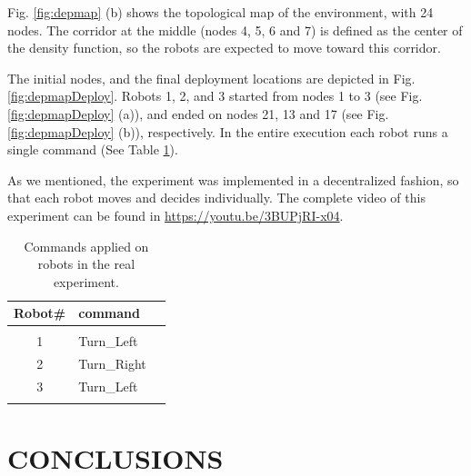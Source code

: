 \documentclass[smallcondensed]{svjour3}
\begin{document}
Fig. \ref{fig:depmap} (b) shows the topological map of the environment, with 24 nodes. The corridor at the middle (nodes 4, 5, 6 and 7) is defined as the center of the density function, so the robots are expected to move toward this corridor.

The initial nodes, and the final deployment locations are depicted in Fig. \ref{fig:depmapDeploy}. Robots 1, 2, and 3 started from nodes 1 to 3 (see Fig. \ref{fig:depmapDeploy} (a)), and ended on nodes 21, 13 and 17 (see Fig. \ref{fig:depmapDeploy} (b)), respectively. In the entire execution each robot runs a single command (See Table \ref{tbl:commands}).

As we mentioned, the experiment was implemented in a decentralized fashion, so that each robot moves and decides individually. The complete video of this experiment can be found in \href{https://youtu.be/3BUPjRI-x04}{https://youtu.be/3BUPjRI-x04}.

\begin{table}[H]
\centering
\caption{Commands applied on robots in the real experiment. }
\label{tbl:commands}
\begin{tabular}{cm{2cm}m{1.2cm}}
Robot\#    & command    \\
\hline\\
1   & Turn\_Left   \\
2 &  Turn\_Right \\
3 & Turn\_Left \\
\hline\\
\end{tabular}
\end{table}

\section{CONCLUSIONS}
\label{sec:conclusion}
\end{document}
